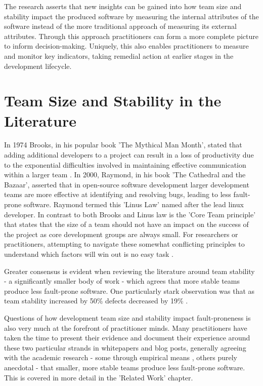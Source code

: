 The research asserts that new insights can be gained into how team size and stability impact the produced software by measuring the internal attributes of the software instead of the more traditional approach of measuring its external attributes. Through this approach practitioners can form a more complete picture to inform decision-making. Uniquely, this also enables practitioners to measure and monitor key indicators, taking remedial action at earlier stages in the development lifecycle.

\section{Team Size and Stability in the Literature} %
In 1974 Brooks, in his popular book 'The Mythical Man Month', stated that adding additional developers to a project can result in a loss of productivity due to the exponential difficulties involved in maintaining effective communication within a larger team \citep{brooks1986mythical}. In 2000, Raymond, in his book 'The Cathedral and the Bazaar', asserted that in open-source software development larger development teams are more effective at identifying and resolving bugs, leading to less fault-prone software. Raymond termed this 'Linus Law' named after the lead linux developer. In contrast to both Brooks and Linus law is the 'Core Team principle' that states that the size of a team should not have an impact on the success of the project as core development groups are always small. For researchers or practitioners, attempting to navigate these somewhat conflicting principles to understand which factors will win out is no easy task \citep{schweik2008brooks}. 

Greater consensus is evident when reviewing the literature around team stability - a significantly smaller body of work - which agrees that more stable teams produce less fault-prone software. One particularly stark observation was that as team stability increased by 50\% defects decreased by 19\% \citep{huckman2009team}.

Questions of how development team size and stability impact fault-proneness is also very much at the forefront of practitioner minds. Many practitioners have taken the time to present their evidence and document their experience around these two particular strands in whitepapers and blog posts, generally agreeing with the academic research - some through empirical means \citep{macheronne2013critical, mcconnell2017less}, others purely anecdotal \citep{miller2006critical, erickson2012are, meccia2015critical, plowman2015seven} - that smaller, more stable teams produce less fault-prone software. This is covered in more detail in the 'Related Work' chapter.

